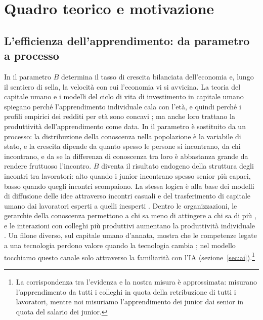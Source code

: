 \documentclass[preprint,12pt,authoryear]{elsarticle}
\begin{document}
\section{Quadro teorico e motivazione}\label{sec:background}

\subsection{L'efficienza dell'apprendimento: da parametro a processo}

In \citet{Lucas1988} il parametro $B$ determina il tasso di crescita bilanciata dell'economia e, lungo il sentiero di sella, la velocità con cui l'economia vi si avvicina. La teoria del capitale umano \citep{Becker1964,Mincer1974} e i modelli del ciclo di vita di investimento in capitale umano \citep{BenPorath1967,Rosen1972} spiegano perché l'apprendimento individuale cala con l'età, e quindi perché i profili empirici dei redditi per età sono concavi \citep{MurphyWelch1990,Lagakos2018}; ma anche loro trattano la produttività dell'apprendimento come data. In \citet{LucasMoll2014} il parametro è sostituito da un processo: la distribuzione della conoscenza nella popolazione è la variabile di stato, e la crescita dipende da quanto spesso le persone si incontrano, da chi incontrano, e da se la differenza di conoscenza tra loro è abbastanza grande da rendere fruttuoso l'incontro. $B$ diventa il risultato endogeno della struttura degli incontri tra lavoratori: alto quando i junior incontrano spesso senior più capaci, basso quando quegli incontri scompaiono. La stessa logica è alla base dei modelli di diffusione delle idee attraverso incontri casuali \citep{AlvarezBueraLucas2013,PerlaTonetti2014,BueraOberfield2020} e del trasferimento di capitale umano dai lavoratori esperti a quelli inesperti \citep{JovanovicNyarko1995}. Dentro le organizzazioni, le gerarchie della conoscenza permettono a chi sa meno di attingere a chi sa di più \citep{Garicano2000,GaricanoRossiHansberg2006}, e le interazioni con colleghi più produttivi aumentano la produttività individuale \citep{Akcigit2018}. Un filone diverso, sul capitale umano d'annata, mostra che le competenze legate a una tecnologia perdono valore quando la tecnologia cambia \citep{ChariHopenhayn1991,Violante2002}; nel modello tocchiamo questo canale solo attraverso la familiarità con l'IA (sezione~\ref{sec:ai}).\footnote{La corrispondenza tra l'evidenza e la nostra misura è approssimata: \citet{Jarosch2021} misurano l'apprendimento da tutti i colleghi in quota della retribuzione di tutti i lavoratori, mentre noi misuriamo l'apprendimento dei junior dai senior in quota del salario dei junior.}
\end{document}
